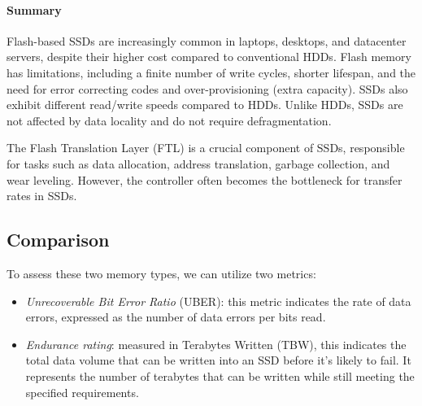 \paragraph*{Summary}
Flash-based SSDs are increasingly common in laptops, desktops, and datacenter servers, despite their higher cost compared to conventional HDDs. 
Flash memory has limitations, including a finite number of write cycles, shorter lifespan, and the need for error correcting codes and over-provisioning (extra capacity). 
SSDs also exhibit different read/write speeds compared to HDDs. Unlike HDDs, SSDs are not affected by data locality and do not require defragmentation.

The Flash Translation Layer (FTL) is a crucial component of SSDs, responsible for tasks such as data allocation, address translation, garbage collection, and wear leveling. 
However, the controller often becomes the bottleneck for transfer rates in SSDs.

\subsection{Comparison}
To assess these two memory types, we can utilize two metrics:
\begin{itemize}
    \item \textit{Unrecoverable Bit Error Ratio} (UBER): this metric indicates the rate of data errors, expressed as the number of data errors per bits read.
    \item \textit{Endurance rating}: measured in Terabytes Written (TBW), this indicates the total data volume that can be written into an SSD before it's likely to fail. 
        It represents the number of terabytes that can be written while still meeting the specified requirements.
\end{itemize}